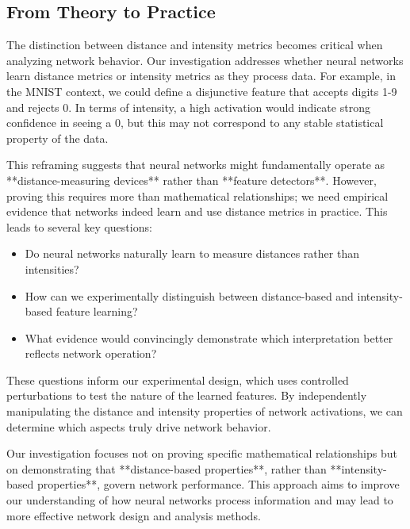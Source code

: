 \subsection{From Theory to Practice}

The distinction between distance and intensity metrics becomes critical when analyzing network behavior. Our investigation addresses whether neural networks learn distance metrics or intensity metrics as they process data. For example, in the MNIST context, we could define a disjunctive feature that accepts digits 1-9 and rejects 0. In terms of intensity, a high activation would indicate strong confidence in seeing a 0, but this may not correspond to any stable statistical property of the data.

This reframing suggests that neural networks might fundamentally operate as **distance-measuring devices** rather than **feature detectors**. However, proving this requires more than mathematical relationships; we need empirical evidence that networks indeed learn and use distance metrics in practice. This leads to several key questions:

\begin{itemize}
    \item Do neural networks naturally learn to measure distances rather than intensities?
    \item How can we experimentally distinguish between distance-based and intensity-based feature learning?
    \item What evidence would convincingly demonstrate which interpretation better reflects network operation?
\end{itemize}

These questions inform our experimental design, which uses controlled perturbations to test the nature of the learned features. By independently manipulating the distance and intensity properties of network activations, we can determine which aspects truly drive network behavior.

Our investigation focuses not on proving specific mathematical relationships but on demonstrating that **distance-based properties**, rather than **intensity-based properties**, govern network performance. This approach aims to improve our understanding of how neural networks process information and may lead to more effective network design and analysis methods.
